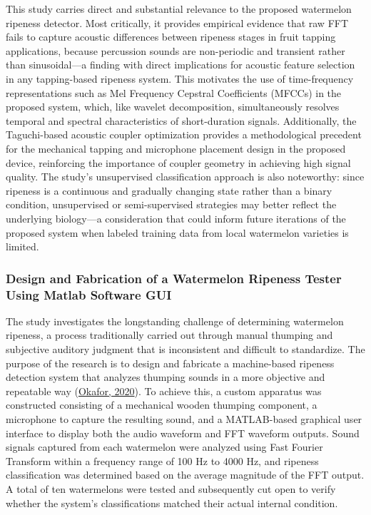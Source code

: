 \begin{thesisprose}
This study carries direct and substantial relevance to the proposed watermelon ripeness detector. Most critically, it provides empirical evidence that raw FFT fails to capture acoustic differences between ripeness stages in fruit tapping applications, because percussion sounds are non-periodic and transient rather than sinusoidal—a finding with direct implications for acoustic feature selection in any tapping-based ripeness system. This motivates the use of time-frequency representations such as Mel Frequency Cepstral Coefficients (MFCCs) in the proposed system, which, like wavelet decomposition, simultaneously resolves temporal and spectral characteristics of short-duration signals. Additionally, the Taguchi-based acoustic coupler optimization provides a methodological precedent for the mechanical tapping and microphone placement design in the proposed device, reinforcing the importance of coupler geometry in achieving high signal quality. The study's unsupervised classification approach is also noteworthy: since ripeness is a continuous and gradually changing state rather than a binary condition, unsupervised or semi-supervised strategies may better reflect the underlying biology—a consideration that could inform future iterations of the proposed system when labeled training data from local watermelon varieties is limited.

\subsubsection{Design and Fabrication of a Watermelon Ripeness Tester Using Matlab Software GUI}

The study investigates the longstanding challenge of determining watermelon ripeness, a process traditionally carried out through manual thumping and subjective auditory judgment that is inconsistent and difficult to standardize. The purpose of the research is to design and fabricate a machine-based ripeness detection system that analyzes thumping sounds in a more objective and repeatable way (\hyperlink{cite.okafor2020}{Okafor, 2020}). To achieve this, a custom apparatus was constructed consisting of a mechanical wooden thumping component, a microphone to capture the resulting sound, and a MATLAB-based graphical user interface to display both the audio waveform and FFT waveform outputs. Sound signals captured from each watermelon were analyzed using Fast Fourier Transform within a frequency range of 100 Hz to 4000 Hz, and ripeness classification was determined based on the average magnitude of the FFT output. A total of ten watermelons were tested and subsequently cut open to verify whether the system's classifications matched their actual internal condition.


\end{thesisprose}
